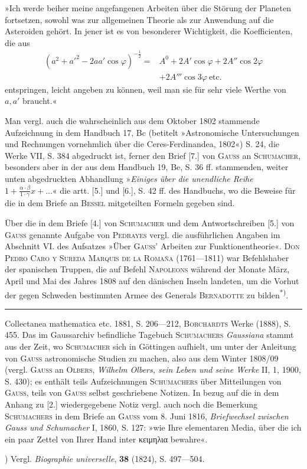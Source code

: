 {\large
\par\indent »Ich werde beiher meine angefangenen Arbeiten über die Störung der Planeten fortsetzen, sowohl was zur allgemeinen Theorie als zur Anwendung auf die Asteroiden gehört. In jener ist es von besonderer Wichtigkeit, die Koefficienten, die aus
\[\begin{aligned}
(a^2+a'^2-2aa'\cos\varphi)^{-\frac12}={}&A^0+2A'\cos\varphi+2A''\cos2\varphi\\
&+2A'''\cos3\varphi\ \text{etc.}
\end{aligned}\]
\noindent entspringen, leicht angeben zu können, weil man sie für sehr viele Werthe von $a,a'$ braucht.«\par}
\noindent Man vergl. auch die wahrscheinlich aus dem Oktober 1802 stammende Aufzeichnung in dem Handbuch 17, Bc (betitelt »Astronomische Untersuchungen und Rechnungen vornehmlich über die Ceres-Ferdinandea, 1802«) S. 24, die Werke VII, S. 384 abgedruckt ist, ferner den Brief [7.] von \textsc{Gauss} an \textsc{Schumacher}, besonders aber in der aus dem Handbuch 19, Be, S. 36 ff. stammenden, weiter unten abgedruckten Abhandlung »\textit{Einiges über die unendliche Reihe} $1+\frac{\alpha\cdot\beta}{1\cdot\gamma}x+\ldots$« die artt. [5.] und [6.], S. 42 ff. des Handbuchs, wo die Beweise für die in dem Briefe an \textsc{Bessel} mitgeteilten Formeln gegeben sind.
\par\indent Über die in dem Briefe [4.] von \textsc{Schumacher} und dem Antwortschreiben [5.] von \textsc{Gauss} genannte Aufgabe von \textsc{Pedrayes} vergl. die ausführlichen Angaben im Abschnitt VI. des Aufsatzes »Über \textsc{Gauss}' Arbeiten zur Funktionentheorie«. \textsc{Don Pedro Caro y Sureda Marquis de la Romaña} (1761—1811) war Befehlshaber der spanischen Truppen, die auf Befehl \textsc{Napoleons} während der Monate März, April und Mai des Jahres 1808 auf den dänischen Inseln landeten, um die Vorhut der gegen Schweden bestimmten Armee des Generals \textsc{Bernadotte} zu bilden\textsuperscript{*)}.
\par\smallskip\noindent\rule{.25\linewidth}{.4pt}\par
{\small
\noindent Collectanea mathematica etc. 1881, S. 206—212, \textsc{Borchardts} Werke (1888), S. 455. Das im Gaussarchiv befindliche Tagebuch \textsc{Schumachers} \textit{Gaussiana} stammt aus der Zeit, wo \textsc{Schumacher} sich in Göttingen aufhielt, um unter der Anleitung von \textsc{Gauss} astronomische Studien zu machen, also aus dem Winter 1808/09 (vergl. \textsc{Gauss} an \textsc{Olbers}, \textit{Wilhelm Olbers, sein Leben und seine Werke} II, 1, 1900, S. 430); es enthält teils Aufzeichnungen \textsc{Schumachers} über Mitteilungen von \textsc{Gauss}, teils von \textsc{Gauss} selbst geschriebene Notizen. In bezug auf die in dem Anhang zu [2.] wiedergegebene Notiz vergl. auch noch die Bemerkung \textsc{Schumachers} in dem Briefe an \textsc{Gauss} vom 8. Juni 1816, \textit{Briefwechsel zwischen Gauss und Schumacher} I, 1860, S. 127: »wie Ihre elementaren Media, über die ich ein paar Zettel von Ihrer Hand inter {κειμηλια} bewahre«.
\par\indent *) Vergl. \textit{Biographie universelle}, \textbf{38} (1824), S. 497—504.
\par}

